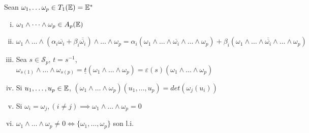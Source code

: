 \begin{prop} \label{prop_pr_ext}
    Sean $\omega_1, \dots \omega_p \in T_1(\mathbb{E}) = \mathbb{E}^*$
    \begin{enumerate}[i)]
        \item $\omega_1 \wedge \dots \wedge \omega_p \in A_p(\mathbb{E})$
        \item \label{prop_pr_ext_ii} $\omega_1 \wedge \dots \wedge \left(\alpha_i \overline{\omega_i} + \beta_i \overline{\overline{\omega_i}} \right)
        \wedge \dots \wedge \omega_p = \alpha_i (\omega_1 \wedge \dots \wedge \overline{\omega_i} \wedge \dots
        \wedge \omega_p) + \beta_i (\omega_1 \wedge \dots \wedge \overline{\overline{\omega_i}} \wedge \dots
        \wedge \omega_p)$
        \item \label{prop_pr_ext_iii} Sea $s \in \mathcal{S}_p$, $t = s^{-1}$, $\omega_{s(1)} \wedge \dots \wedge \omega_{s(p)} =
        \underline{t}\left(\omega_1 \wedge \dots \wedge \omega_p \right) = \varepsilon(s)\left( \omega_1
        \wedge \dots \wedge \omega_p \right)$
        \item \label{prop_pr_ext_iv} Si $u_1, \dots, u_p \in \mathbb{E}$, $\left( \omega_1 \wedge \dots \wedge \omega_p\right) \left(u_1, \dots,
        u_p\right) = det\left(\omega_j(u_i)\right)$
        \item \label{prop_pr_ext_v} Si $\omega_i = \omega_j , (i \neq j) \implies \omega_1 \wedge \dots \wedge \omega_p = 0$
        \item $\omega_1 \wedge \dots \wedge \omega_p \neq 0 \iff \{\omega_1,\dots,\omega_p\}$ son l.i.
    \end{enumerate}
\end{prop}
